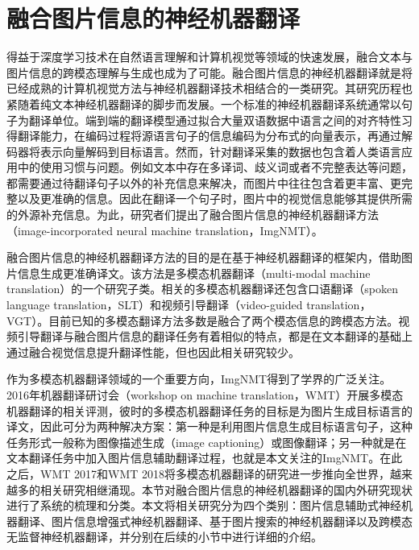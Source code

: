 \section{融合图片信息的神经机器翻译}
\label{sec:2_imgnmt}

得益于深度学习技术在自然语言理解和计算机视觉等领域的快速发展，融合文本与图片信息的跨模态理解与生成也成为了可能。融合图片信息的神经机器翻译就是将已经成熟的计算机视觉方法与神经机器翻译技术相结合的一类研究。其研究历程也紧随着纯文本神经机器翻译的脚步而发展。一个标准的神经机器翻译系统通常以句子为翻译单位。端到端的翻译模型通过拟合大量双语数据中语言之间的对齐特性习得翻译能力，在编码过程将源语言句子的信息编码为分布式的向量表示，再通过解码器将表示向量解码到目标语言。然而，针对翻译采集的数据也包含着人类语言应用中的使用习惯与问题。例如文本中存在多译词、歧义词或者不完整表达等问题，都需要通过待翻译句子以外的补充信息来解决，而图片中往往包含着更丰富、更完整以及更准确的信息。因此在翻译一个句子时，图片中的视觉信息能够其提供所需的外源补充信息。为此，研究者们提出了融合图片信息的神经机器翻译方法（image-incorporated neural machine translation，ImgNMT）。

融合图片信息的神经机器翻译方法的目的是在基于神经机器翻译的框架内，借助图片信息生成更准确译文。该方法是多模态机器翻译（multi-modal machine translation）的一个研究子类。相关的多模态机器翻译还包含口语翻译\cite{82_DBLP:conf/icassp/Vidal97,83_DBLP:conf/icassp/Ney99,84_DBLP:conf/interspeech/WeissCJWC17,85_DBLP:conf/icassp/BerardBKP18}（spoken language translation，SLT）和视频引导翻译\cite{86_DBLP:conf/lrec/LisonT16,87_DBLP:journals/corr/abs-1811-00347,88_DBLP:conf/iccv/WangWCLWW19}（video-guided translation，VGT）\cite{81_DBLP:journals/mt/SulubacakCGREST20}。目前已知的多模态翻译方法多数是融合了两个模态信息的跨模态方法。视频引导翻译与融合图片信息的翻译任务有着相似的特点，都是在文本翻译的基础上通过融合视觉信息提升翻译性能，但也因此相关研究较少。

作为多模态机器翻译领域的一个重要方向，ImgNMT得到了学界的广泛关注。2016年机器翻译研讨会（workshop on machine translation，WMT）开展多模态机器翻译的相关评测\cite{112_specia-etal-2016-shared}，彼时的多模态机器翻译任务的目标是为图片生成目标语言的译文，因此可分为两种解决方案：第一种是利用图片信息生成目标语言句子，这种任务形式一般称为图像描述生成（image captioning）或图像翻译；另一种就是在文本翻译任务中加入图片信息辅助翻译过程，也就是本文关注的ImgNMT。在此之后，WMT 2017\cite{113_elliott-etal-2017-findings}和WMT 2018\cite{114_barrault-etal-2018-findings}将多模态机器翻译的研究进一步推向全世界，越来越多的相关研究相继涌现。本节对融合图片信息的神经机器翻译的国内外研究现状进行了系统的梳理和分类。本文将相关研究分为四个类别：图片信息辅助式神经机器翻译、图片信息增强式神经机器翻译、基于图片搜索的神经机器翻译以及跨模态无监督神经机器翻译，并分别在后续的小节中进行详细的介绍。

